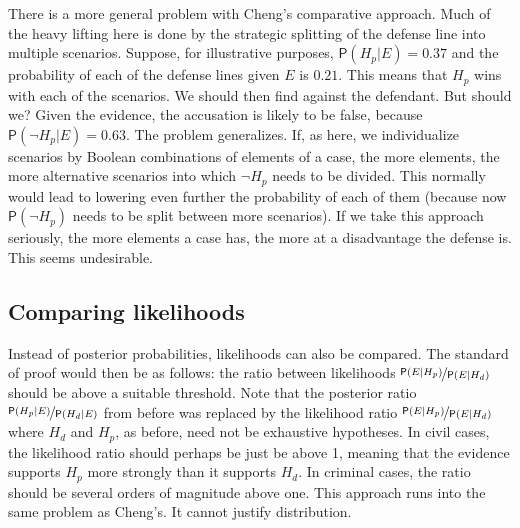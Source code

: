 \documentclass[
  10pt,
  dvipsnames,enabledeprecatedfontcommands]{scrartcl}
\newcommand{\n}{\neg}
\newcommand{\pr}[1]{\ensuremath{\mathsf{P}(#1)}}
\begin{document}
There is a more general problem with Cheng's comparative approach. Much
of the heavy lifting here is done by the strategic splitting of the
defense line into multiple scenarios. Suppose, for illustrative
purposes, \(\pr{H_p\vert E}=0.37\) and the probability of each of the
defense lines given \(E\) is \(0.21\). This means that \(H_p\) wins with
each of the scenarios. We should then find against the defendant. But
should we? Given the evidence, the accusation is likely to be false,
because \(\pr{\n H_p \vert E}=0.63\). The problem generalizes. If, as
here, we individualize scenarios by Boolean combinations of elements of
a case, the more elements, the more alternative scenarios into which
\(\n H_p\) needs to be divided. This normally would lead to lowering
even further the probability of each of them (because now
\(\pr{\n H_p}\) needs to be split between more scenarios). If we take
this approach seriously, the more elements a case has, the more at a
disadvantage the defense is. This seems undesirable.

\hypertarget{comparing-likelihoods}{%
\subsection{Comparing likelihoods}\label{comparing-likelihoods}}

Instead of posterior probabilities, likelihoods can also be compared.
The standard of proof would then be as follows: the ratio between
likelihoods \(\nicefrac{\pr{E \vert H_p}}{\pr{E \vert H_d}}\) should be
above a suitable threshold. Note that the posterior ratio
\(\nicefrac{\pr{H_p \vert E}}{\pr{H_d \vert E}}\) from before was
replaced by the likelihood ratio
\(\nicefrac{\pr{E \vert H_p}}{\pr{E \vert H_d}}\) where \(H_d\) and
\(H_p\), as before, need not be exhaustive hypotheses. In civil cases,
the likelihood ratio should perhaps be just be above 1, meaning that the
evidence supports \(H_p\) more strongly than it supports \(H_d\). In
criminal cases, the ratio should be several orders of magnitude above
one. This approach runs into the same problem as Cheng's. It cannot
justify distribution.
\end{document}
